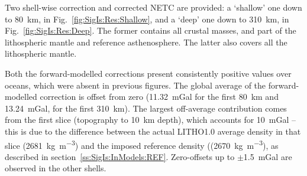 Two shell-wise correction and corrected NETC are provided: a `shallow' one down to \SI{80}{\kilo \metre}, in Fig.~\ref{fig:SigIs:Res:Shallow}, and a `deep' one down to \SI{310}{\kilo \metre}, in Fig.~\ref{fig:SigIs:Res:Deep}.
The former contains all crustal masses, and part of the lithospheric mantle and reference asthenosphere. The latter also covers all the lithospheric mantle.

Both the forward-modelled corrections present consistently positive values over oceans, which were absent in previous figures.
The global average of the forward-modelled correction is offset from zero (\SI[retain-explicit-plus]{+11.32}{mGal} for the first \SI{80}{\kilo \metre} and \SI[retain-explicit-plus]{+13.24}{mGal}, for the first \SI{310}{\kilo \metre}).
The largest off-average contribution comes from the first slice (topography to \SI{10}{\kilo \metre} depth), which accounts for \SI[retain-explicit-plus]{+10}{mGal} -- this is due to the difference between the actual {LITHO1.0} average density in that slice (\SI{2681}{\kilo \gram \per \cubic \metre}) and the imposed reference density ((\SI{2670}{\kilo \gram \per \cubic \metre}), as described in section~\ref{ss:SigIs:InModels:REF}.
Zero-offsets up to $\pm$\SI{1.5}{mGal} are observed in the other shells.



